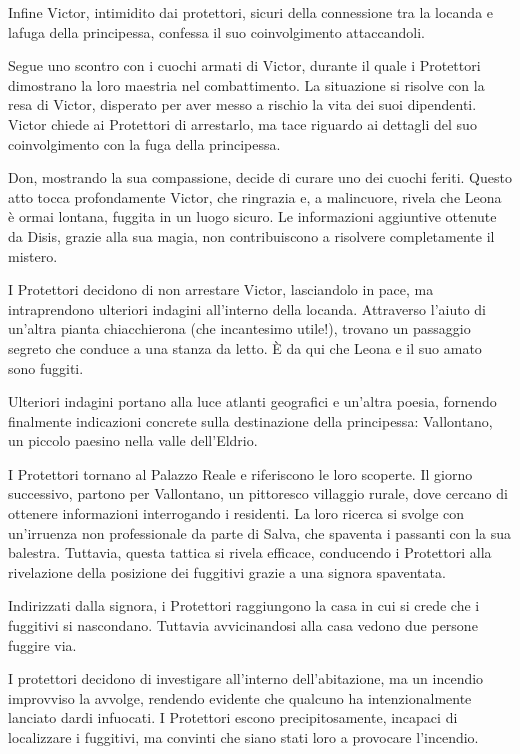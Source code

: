 Infine Victor, intimidito dai protettori, sicuri della connessione tra
la locanda e lafuga della principessa, confessa il suo coinvolgimento
attaccandoli.

Segue uno scontro con i cuochi armati di Victor, durante il quale i
Protettori dimostrano la loro maestria nel combattimento. La situazione
si risolve con la resa di Victor, disperato per aver messo a rischio la
vita dei suoi dipendenti. Victor chiede ai Protettori di arrestarlo, ma
tace riguardo ai dettagli del suo coinvolgimento con la fuga della
principessa.

Don, mostrando la sua compassione, decide di curare uno dei cuochi
feriti. Questo atto tocca profondamente Victor, che ringrazia e, a
malincuore, rivela che Leona è ormai lontana, fuggita in un luogo
sicuro. Le informazioni aggiuntive ottenute da Disis, grazie alla sua
magia, non contribuiscono a risolvere completamente il mistero.

I Protettori decidono di non arrestare Victor, lasciandolo in pace, ma
intraprendono ulteriori indagini all'interno della locanda. Attraverso
l'aiuto di un'altra pianta chiacchierona (che incantesimo utile!),
trovano un passaggio segreto che conduce a una stanza da letto. È da qui
che Leona e il suo amato sono fuggiti.

Ulteriori indagini portano alla luce atlanti geografici e un'altra
poesia, fornendo finalmente indicazioni concrete sulla destinazione
della principessa: Vallontano, un piccolo paesino nella valle
dell'Eldrio.

I Protettori tornano al Palazzo Reale e riferiscono le loro scoperte. Il
giorno successivo, partono per Vallontano, un pittoresco villaggio
rurale, dove cercano di ottenere informazioni interrogando i residenti.
La loro ricerca si svolge con un'irruenza non professionale da parte di
Salva, che spaventa i passanti con la sua balestra. Tuttavia, questa
tattica si rivela efficace, conducendo i Protettori alla rivelazione
della posizione dei fuggitivi grazie a una signora spaventata.

Indirizzati dalla signora, i Protettori raggiungono la casa in cui si
crede che i fuggitivi si nascondano. Tuttavia avvicinandosi alla casa
vedono due persone fuggire via.

I protettori decidono di investigare all'interno dell'abitazione, ma un
incendio improvviso la avvolge, rendendo evidente che qualcuno ha
intenzionalmente lanciato dardi infuocati. I Protettori escono
precipitosamente, incapaci di localizzare i fuggitivi, ma convinti che
siano stati loro a provocare l'incendio.


